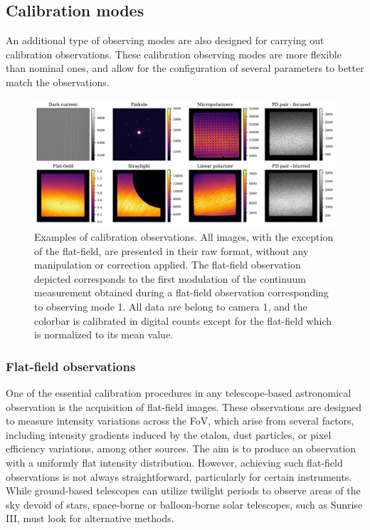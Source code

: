 \subsection{Calibration modes}
An additional type of observing modes are also designed for carrying out calibration observations. These calibration observing modes are more flexible than nominal ones, and allow for the configuration of several parameters to better match the observations.

\begin{figure}[t]
    \includegraphics[width=\textwidth]{figures/Pipeline/cal_modes_examples.pdf}
    \caption[Calibration observation modes examples of TuMag.]{
      Examples of calibration observations. All images, with the exception of the flat-field, are presented in their raw format, without any manipulation or correction applied. The flat-field observation depicted corresponds to the first modulation of the continuum measurement obtained during a flat-field observation corresponding to observing mode 1. All data are belong to camera 1, and the colorbar is calibrated in digital counts except for the flat-field which is normalized to its mean value. }
      \label{fig_pipeline: cal_examples}
\end{figure}

\subsubsection{Flat-field observations}

One of the essential calibration procedures in any telescope-based astronomical observation is the acquisition of flat-field images. These observations are designed to measure intensity variations across the FoV, which arise from several factors, including intensity gradients induced by the etalon, dust particles, or pixel efficiency variations, among other sources. The aim is to produce an observation with a uniformly flat intensity distribution. However, achieving such flat-field observations is not always straightforward, particularly for certain instruments. While ground-based telescopes can utilize twilight periods to observe areas of the sky devoid of stars, space-borne or balloon-borne solar telescopes, such as Sunrise III, must look for alternative methods. 

